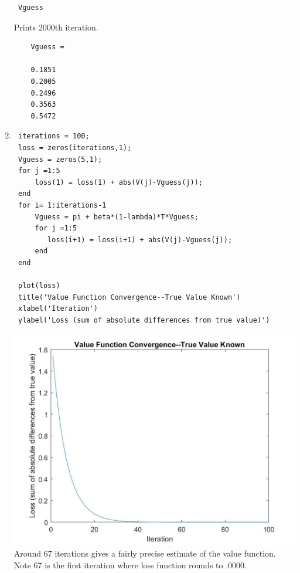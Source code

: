 \documentclass[12pt]{article}
\begin{document}
\begin{onehalfspace}
\begin{enumerate}[1.]
\begin{lstlisting}
 Vguess
	\end{lstlisting}
	Prints 2000th iteration.
	\begin{lstlisting}
	Vguess =

    0.1851
    0.2005
    0.2496
    0.3563
    0.5472
	\end{lstlisting}
	
	\item
	\begin{lstlisting}
 iterations = 100;
 loss = zeros(iterations,1);
 Vguess = zeros(5,1);
 for j =1:5
     loss(1) = loss(1) + abs(V(j)-Vguess(j));
 end
 for i= 1:iterations-1
     Vguess = pi + beta*(1-lambda)*T*Vguess;
     for j =1:5
        loss(i+1) = loss(i+1) + abs(V(j)-Vguess(j));
     end
 end
 
 plot(loss)
 title('Value Function Convergence--True Value Known')
 xlabel('Iteration')
 ylabel('Loss (sum of absolute differences from true value)')
	\end{lstlisting}
	\includegraphics[width=\textwidth]{Econ_8307_PS2_4_3.jpg}
	Around 67 iterations gives a fairly precise estimate of the value function. Note 67 is the first iteration where loss function rounds to .0000.
 

\end{enumerate}
\end{onehalfspace}
\end{document}
